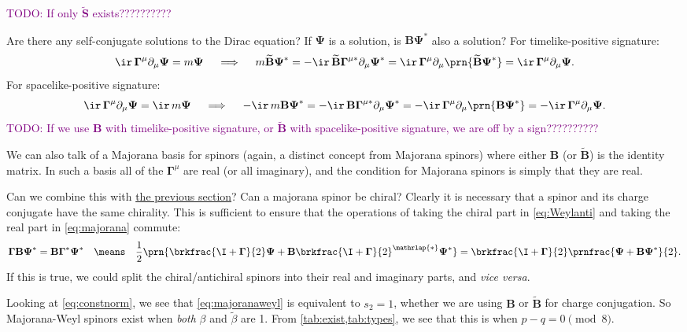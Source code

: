 \documentclass[11pt]{article}
\newcommand{\todo}[1]{\textcolor{purple}{TODO: #1}}
\newcommand{\cc}{^\ast}
\newcommand{\Gammab}{\boldsymbol{\Gamma}}
\newcommand{\muc}{{\mu\ast}}
\renewcommand{\S}{\mathbf{S}}
\newcommand{\B}{\mathbf{B}}
\newcommand{\Bt}{\widetilde{\B}}
\newcommand{\St}{\widetilde{\S}}
\newcommand{\Psib}{\boldsymbol{\Psi}}
\newcommand{\betat}{\tilde{\beta}}
\begin{document}
\todo{If only \(\St\) exists??????????}

Are there any self-conjugate solutions to the Dirac equation?
If \(\Psib\) is a solution, is \(\B \Psib\cc\) also a solution?
For timelike-positive signature:
%
\begin{equation*}
  \ir\, \Gammab^\mu \partial_\mu \Psib = m \Psib
  \quad\implies\quad
  m \Bt \Psib\cc 
    = - \ir\, \Bt \Gammab^\muc \partial_\mu \Psib\cc 
    = \ir\, \Gammab^\mu \partial_\mu \prn{\Bt \Psib\cc} 
    = \ir\, \Gammab^\mu \partial_\mu \Psib. 
\end{equation*}
%
For spacelike-positive signature:
%
\begin{equation*}
  \ir\, \Gammab^\mu \partial_\mu \Psib = \ir\, m \Psib
  \quad\implies\quad
  - \ir\, m \B \Psib\cc 
    = - \ir\, \B \Gammab^\muc \partial_\mu \Psib\cc 
    = - \ir\, \Gammab^\mu \partial_\mu \prn{\B \Psib\cc} 
    = - \ir\, \Gammab^\mu \partial_\mu \Psib. 
\end{equation*}
%
\todo{If we use \(\B\) with timelike-positive signature, or \(\Bt\) with spacelike-positive signature, we are off by a sign??????????}

We can also talk of a Majorana basis for spinors (again, a distinct concept from Majorana spinors) where either \(\B\) (or \(\Bt\)) is the identity matrix.
In such a basis all of the \(\Gammab^\mu\) are real (or all imaginary), and the condition for Majorana spinors is simply that they are real.

Can we combine this with \hyperref[sec:weyl]{the previous section}?
Can a majorana spinor be chiral?
Clearly it is necessary that a spinor and its charge conjugate  have the same chirality.
This is sufficient to ensure that the operations of taking the chiral part in \cref{eq:Weylanti} and taking the real part in \cref{eq:majorana} commute:
%
\begin{equation}\label{eq:majoranaweyl}
  \Gammab \B \Psib\cc = \B \Gammab\cc \Psib\cc
  \quad\means\quad
  \frac{1}{2}\prn{\brkfrac{\I+\Gammab}{2} \Psib 
    + \B \brkfrac{\I+\Gammab}{2}^{\mathrlap{\ast}} \Psib\cc} 
    = \brkfrac{\I+\Gammab}{2} \prnfrac{\Psib + \B \Psib\cc}{2}.
\end{equation}
%
If this is true, we could split the chiral/antichiral spinors into their real and imaginary parts, and \emph{vice versa}.

Looking at \cref{eq:constnorm}, we see that \cref{eq:majoranaweyl} is equivalent to \(s_2 = 1\), whether we are using \(\B\) or \(\Bt\) for charge conjugation.
So Majorana-Weyl spinors exist when \emph{both} \(\beta\) and \(\betat\) are 1.
From \cref{tab:exist,tab:types}, we see that this is when \( p-q = 0 \pmod 8 \).
\end{document}
